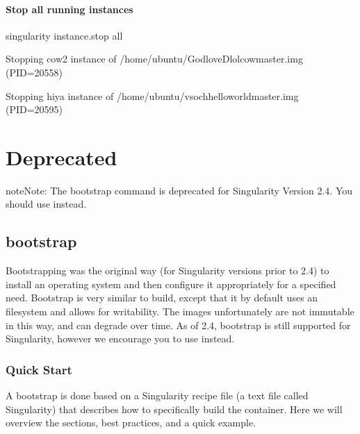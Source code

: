 \documentclass[letterpaper,10pt,english]{sphinxmanual}
\begin{document}
\paragraph{Stop all running instances}
\label{\detokenize{appendix:stop-all-running-instances}}
%
\begin{sphinxVerbatim}[commandchars=\\\{\}]
\PYGZdl{} singularity instance.stop \PYGZhy{}\PYGZhy{}all

Stopping cow2 instance of /home/ubuntu/GodloveD\PYGZhy{}lolcow\PYGZhy{}master.img (PID=20558)

Stopping hiya instance of /home/ubuntu/vsoch\PYGZhy{}hello\PYGZhy{}world\PYGZhy{}master.img (PID=20595)
\end{sphinxVerbatim}


\section{Deprecated}
\label{\detokenize{appendix:deprecated}}
\begin{sphinxadmonition}{note}{Note:}
The bootstrap command is deprecated for Singularity Version
2.4. You should use  instead.
\end{sphinxadmonition}


\subsection{bootstrap}
\label{\detokenize{appendix:id56}}\label{\detokenize{appendix:sec-bootstrap}}
Bootstrapping was the original way (for Singularity versions prior to
2.4) to install an operating system and then configure it appropriately
for a specified need. Bootstrap is very similar to build, except that it
by default uses an  filesystem and allows for writability. The
images unfortunately are not immutable in this way, and can degrade over
time. As of 2.4, bootstrap is still supported for Singularity, however
we encourage you to use  instead.


\subsubsection{Quick Start}
\label{\detokenize{appendix:quick-start}}
A bootstrap is done based on a Singularity recipe file (a text file
called Singularity) that describes how to specifically build the
container. Here we will overview the sections, best practices, and a
quick example.
\end{document}
